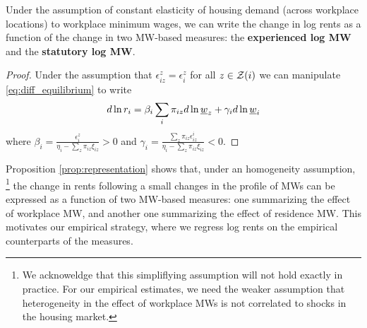 \begin{prop}[Representation]\label{prop:representation}
    Under the assumption of constant elasticity of housing demand (across workplace locations)
    to workplace minimum wages,
    we can write the change in log rents as a function of the change in two 
    MW-based measures: the \textbf{experienced log MW} and the \textbf{statutory 
    log MW}.
\end{prop}
\begin{proof}
    Under the assumption that $\epsilon_{iz}^z = \epsilon_i^z$ for all $z\in\mathcal{Z}(i)$ 
    we can manipulate \eqref{eq:diff_equilibrium} to write
    \begin{equation} \label{eq:theory_represenation}
        d \ln r_i = \beta_i \sum_i \pi_{iz} d\ln \underline{w}_z + \gamma_i d \ln \underline{w}_i
    \end{equation}
    where $\beta_i = \frac{\epsilon_{i}^z}{\eta_{i} - \sum_z \pi_{iz} \xi_{iz}} 
    >0$ and $\gamma_i = \frac{\sum_z \pi_{iz} \epsilon_{iz}^i}{\eta_{i} 
            - \sum_z \pi_{iz} \xi_{iz}} < 0$.
\end{proof}

Proposition \ref{prop:representation} shows that, under an homogeneity assumption,%
\footnote{We acknoweldge that this simpliflying assumption will not hold exactly
in practice.
For our empirical estimates, we need the weaker assumption that heterogeneity in 
the effect of workplace MWs is not correlated to shocks in the housing market.}
the change in rents following a small changes in the profile of MWs can be expressed 
as a function of two MW-based measures: one summarizing the effect of workplace MW,
and another one summarizing the effect of residence MW.
This motivates our empirical strategy, where we regress log rents on the empirical
counterparts of the measures.

